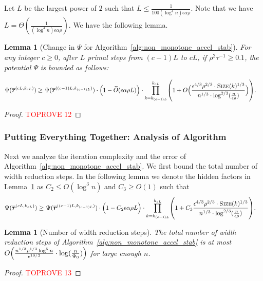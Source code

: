 \documentclass[11pt]{article}
\newtheorem{lemma}[theorem]{Lemma}
\let\originalleft\left
\let\originalright\right
\renewcommand{\left}{\mathopen{}\mathclose\bgroup\originalleft}
\renewcommand{\right}{\aftergroup\egroup\originalright}
\newcommand\rr{\boldsymbol{\mathit{r}}}
\newcommand{\wt}{\widetilde}
\newcommand{\ov}{\overline}
\begin{document}
Let $L$ be the largest power of $2$ such that $L \leq \frac{1}{100 (\log^4 n) \epsilon \alpha \rho}$. Note that we have $L = \Theta(\frac{1}{(\log^4 n) \epsilon \alpha \rho})$. We have the following lemma.
\begin{lemma}[Change in $\Psi$ for Algorithm~\ref{alg:non_monotone_accel_stab}]\label{lem:ChangePsiStab}
For any integer $c \geq 0$, after $L$ primal steps from $(c-1)L$ to $cL$, if $\rho^2 \tau^{-1} \geq 0.1$, the potential $\Psi$ is bounded as follows:

\begin{align*}
\Psi(\ov{\rr}^{(cL,k_{cL})}) 
\geq &~ \Psi(\ov{\rr}^{((c-1)L,k_{(c-1)L})}) \cdot \Big(1 -  \wt{O}(\epsilon \alpha \rho L) \Big) \cdot \prod_{k=k_{(c-1)L}}^{k_{cL}} \left( 1 + O\Big(\frac{\epsilon^{4/3} \rho^{2/3} \cdot \textsc{Size}(k)^{1/3}}{n^{1/3} \cdot \log^{2/3}(\frac{n}{\epsilon \rho})}\Big) \right).
\end{align*}
\end{lemma}
\begin{proof}\textcolor{red}{TOPROVE 12}\end{proof}

\subsubsection{Putting Everything Together: Analysis of Algorithm}
Next we analyze the iteration complexity and the error of Algorithm~\ref{alg:non_monotone_accel_stab}. We first bound the total number of width reduction steps. In the following lemma we denote the hidden factors in Lemma~\ref{lem:ChangePsiStab} as $C_2 \leq O(\log^3 n)$ and $C_3 \geq O(1)$ such that
\begin{align*}
\Psi(\ov{\rr}^{(cL,k_{cL})}) 
\geq &~ \Psi(\ov{\rr}^{((c-1)L,k_{(c-1)L})}) \cdot \Big(1 -  C_2 \epsilon \alpha \rho L \Big) \cdot \prod_{k=k_{(c-1)L}}^{k_{cL}} \left( 1 + C_3 \frac{\epsilon^{4/3} \rho^{2/3} \cdot \textsc{Size}(k)^{1/3}}{n^{1/3} \cdot \log^{2/3}(\frac{n}{\epsilon \rho})} \right).
\end{align*}
\begin{lemma}[Number of width reduction steps]\label{lem:number_of_width_reduction_steps}
The total number of width reduction steps of Algorithm~\ref{alg:non_monotone_accel_stab} is at most $O\left(\frac{n^{1/3} \rho^{1/3} \log^5 n}{\epsilon^{10/3}} \cdot \log(\frac{n}{\Psi_0}) \right)$ for large enough $n$. 
\end{lemma}
\begin{proof}\textcolor{red}{TOPROVE 13}\end{proof}
\end{document}
